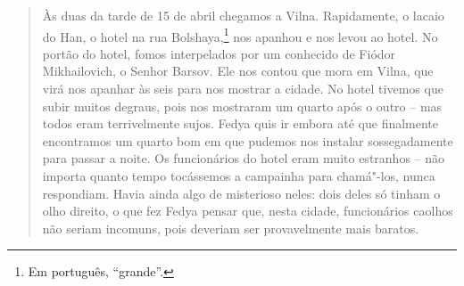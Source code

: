 \begin{quote}
Às duas da tarde de 15 de abril chegamos a Vilna. Rapidamente, o lacaio
do Han, o hotel na rua Bolshaya,\footnote{Em português, ``grande''.} nos apanhou e nos levou ao
hotel. No portão do hotel, fomos interpelados por um conhecido de Fiódor
Mikhailovich, o Senhor Barsov. Ele nos contou que mora em Vilna, que
virá nos apanhar às seis para nos mostrar a cidade. No hotel tivemos que
subir muitos degraus, pois nos mostraram um quarto após o outro -- mas
todos eram terrivelmente sujos. Fedya quis ir embora até que finalmente
encontramos um quarto bom em que pudemos nos instalar sossegadamente
para passar a noite. Os funcionários do hotel eram muito estranhos -- não
importa quanto tempo tocássemos a campainha para chamá"-los, nunca
respondiam. Havia ainda algo de misterioso neles: dois deles só tinham o
olho direito, o que fez Fedya pensar que, nesta cidade, funcionários
caolhos não seriam incomuns, pois deveriam ser provavelmente mais
baratos.


\end{quote}

